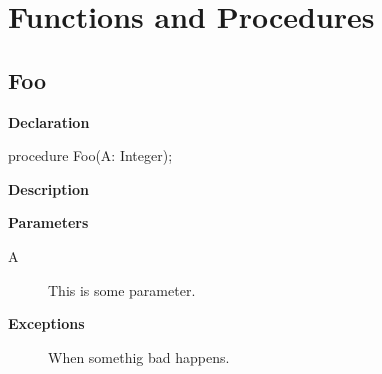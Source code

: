 \documentclass{report}
\begin{document}
\section{Functions and Procedures}
\subsection*{Foo}
\begin{list}{}{
\setlength{\itemindent}{0cm}
\setlength{\listparindent}{0cm}
\setlength{\leftmargin}{\evensidemargin}
\addtolength{\leftmargin}{\tmplength}
\settowidth{\labelsep}{X}
\addtolength{\leftmargin}{\labelsep}
\setlength{\labelwidth}{\tmplength}
}
\begin{flushleft}
\item[\textbf{Declaration}\hfill]
\begin{ttfamily}
procedure Foo(A: Integer);\end{ttfamily}


\end{flushleft}
\par
\item[\textbf{Description}]
 \par
\item[\textbf{Parameters}]
\begin{description}
\item[A] This is some parameter.
\end{description}
\item[\textbf{Exceptions}]
\begin{description}
\item[\begin{ttfamily}TMyException\end{ttfamily}(\ref{A.TMyException})] When somethig bad happens.
\end{description}


\end{list}
\end{document}

